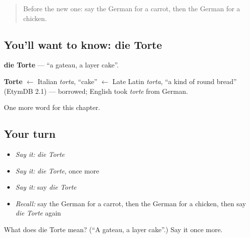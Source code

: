 \label{lesson:GE-C199-torte}



\begin{quote}
Before the new one: say the German for a carrot, then the German for a chicken.
\end{quote}

\subsection*{You'll want to know: die Torte}
\textbf{die Torte} — \textquotedblleft{}a gateau, a layer cake\textquotedblright{}.

\begin{cousinweb}
\textbf{Torte} $\leftarrow$ Italian \emph{torta}, \textquotedblleft{}cake\textquotedblright{} $\leftarrow$ Late Latin \emph{torta}, \textquotedblleft{}a kind of round bread\textquotedblright{} (EtymDB 2.1) — borrowed; English took \emph{torte} from German.
\end{cousinweb}

\begin{grammarlens}[title={What you've built}]
One more word for this chapter.
\end{grammarlens}

\subsection*{Your turn}
\begin{itemize}
\raggedright
  \item \emph{Say it:} \emph{die Torte}
  \item \emph{Say it:} \emph{die Torte}, once more
  \item \emph{Say it:} say \emph{die Torte}
  \item \emph{Recall:} say the German for a carrot, then the German for a chicken, then say \emph{die Torte} again
\end{itemize}

\begin{tcolorbox}[breakable,colback=teal!4,colframe=teal!35!black,title={Before you move on}]
What does die Torte mean? (\textquotedblleft{}A gateau, a layer cake\textquotedblright{}.) Say it once more.
\end{tcolorbox}
